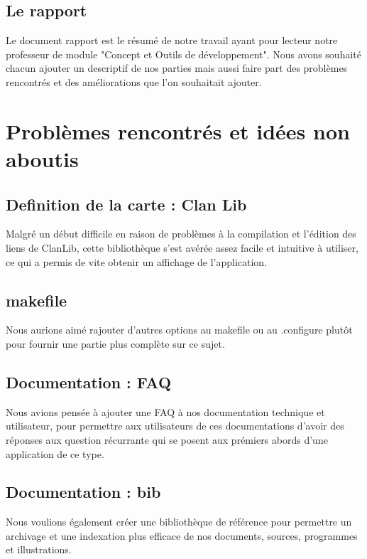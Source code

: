 \documentclass[a4paper 12pts]{article}
\begin{document}
\subsection{Le rapport}

Le document rapport est le résumé de notre travail ayant pour lecteur notre professeur de module "Concept et Outils de développement".
Nous avons souhaité chacun ajouter un descriptif de nos parties mais aussi faire part des problèmes rencontrés et des améliorations que l'on souhaitait ajouter.

\newpage
\section{Problèmes rencontrés et idées non aboutis}

\subsection{Definition de la carte : Clan Lib}
Malgré un début difficile en raison de problèmes à la compilation et l'édition des liens de ClanLib, cette bibliothèque s'est avérée assez facile et intuitive à utiliser, ce qui a permis de vite obtenir un affichage de l'application.

\subsection{makefile}
Nous aurions aimé rajouter d'autres options au makefile ou au .configure plutôt pour fournir une partie plus complète sur ce sujet.

\subsection{Documentation : FAQ}

Nous avions pensée à ajouter une FAQ à nos documentation technique et utilisateur, pour permettre aux utilisateurs de ces documentations d'avoir des réponses aux question récurrante qui se posent aux prémiers abords d'une application de ce type.

\subsection{Documentation : bib}

Nous voulions également créer une bibliothèque de référence pour permettre un archivage et une indexation plus efficace de nos documents, sources, programmes et illustrations.
\end{document}
